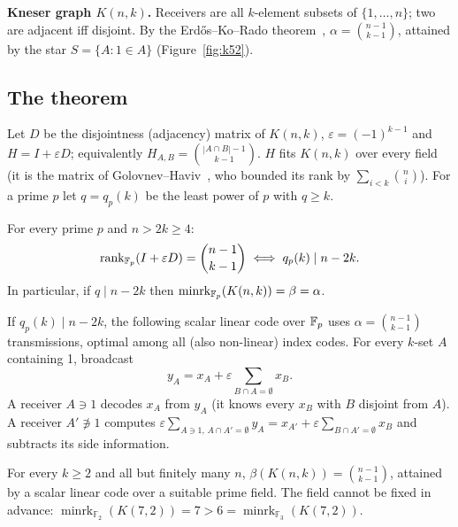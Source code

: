 \textbf{Kneser graph $K(n,k)$.} Receivers are all $k$-element subsets of $\{1,\dots,n\}$; two are adjacent iff
disjoint. By the Erd\H{o}s--Ko--Rado theorem~\cite{ekr}, $\alpha=\binom{n-1}{k-1}$, attained by the star $S=\{A: 1\in A\}$
(Figure~\ref{fig:k52}).

\subsection{The theorem}
Let $D$ be the disjointness (adjacency) matrix of $K(n,k)$, $\varepsilon=(-1)^{k-1}$ and $H=I+\varepsilon D$;
equivalently $H_{A,B}=\binom{|A\cap B|-1}{k-1}$. $H$ fits $K(n,k)$ over every field (it is the matrix of
Golovnev--Haviv~\cite{gh}, who bounded its rank by $\sum_{i<k}\binom{n}{i}$). For a prime $p$ let $q=q_p(k)$ be the
least power of $p$ with $q\ge k$.

\begin{theorem}\label{thm:rank}
For every prime $p$ and $n>2k\ge4$:
\[
  \operatorname{rank}_{\mathbb{F}_p}(I+\varepsilon D) = \binom{n-1}{k-1} \iff q_p(k) \mid n-2k .
\]
In particular, if $q\mid n-2k$ then $\operatorname{minrk}_{\mathbb{F}_p}(K(n,k))=\beta=\alpha$.
\end{theorem}

\begin{theorem}\label{thm:code}
If $q_p(k)\mid n-2k$, the following scalar linear code over $\mathbb{F}_p$ uses $\alpha=\binom{n-1}{k-1}$ transmissions,
optimal among all (also non-linear) index codes. For every $k$-set $A$ containing 1, broadcast
\[
  y_A = x_A + \varepsilon \sum_{B\cap A=\emptyset} x_B .
\]
A receiver $A\ni1$ decodes $x_A$ from $y_A$ (it knows every $x_B$ with $B$ disjoint from $A$). A receiver $A'\not\ni1$
computes $\varepsilon\sum_{A\ni1,\,A\cap A'=\emptyset} y_A = x_{A'}+\varepsilon\sum_{B\cap A'=\emptyset}x_B$ and
subtracts its side information.
\end{theorem}

\begin{corollary}
For every $k\ge2$ and all but finitely many $n$, $\beta(K(n,k))=\binom{n-1}{k-1}$, attained by a scalar linear code
over a suitable prime field. The field cannot be fixed in advance:
$\operatorname{minrk}_{\mathbb{F}_2}(K(7,2))=7>6=\operatorname{minrk}_{\mathbb{F}_3}(K(7,2))$.
\end{corollary}

